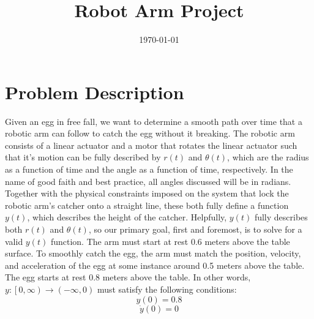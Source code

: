 \documentclass[nofoot,pdf-a,balance,upint,subscriptcorrection,varvw]{asmeconf}
\begin{document}
    
    \title{Robot Arm Project}
    \date{\today}

    \maketitle

    \section*{Problem Description}
	
    Given an egg in free fall, we want to determine a smooth path over time that a robotic arm can follow to catch the egg without it breaking. The robotic arm consists of a linear actuator and a motor that rotates the linear actuator such that it's motion can be fully described by $r\left(t\right)$ and $\theta\left(t\right)$, which are the radius as a function of time and the angle as a function of time, respectively. In the name of good faith and best practice, all angles discussed will be in radians. Together with the physical constraints imposed on the system that lock the robotic arm's catcher onto a straight line, these both fully define a function $y\left(t\right)$, which describes the height of the catcher. Helpfully, $y\left(t\right)$ fully describes both $r\left(t\right)$ and $\theta\left(t\right)$, so our primary goal, first and foremost, is to solve for a valid $y\left(t\right)$ function. The arm must start at rest 0.6 meters above the table surface. To smoothly catch the egg, the arm must match the position, velocity, and acceleration of the egg at some instance around 0.5 meters above the table. The egg starts at rest 0.8 meters above the table.\newline \newline 
    In other words, $y:\left[0, \infty\right) \to \left(-\infty, 0\right)
$ must satisfy the following conditions:
    \begin{equation}
        y\left(0\right) = 0.8
    \end{equation}
    \begin{equation}
        \dot{y}\left(0\right) = 0
    \end{equation}
	
\end{document}
